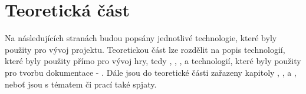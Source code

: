 \documentclass[main.tex]{subfiles}
\begin{document}
\section{Teoretická část} 
Na následujících stranách budou popsány jednotlivé technologie, které byly použity pro vývoj projektu. Teoretickou část lze rozdělit na popis technologií, které byly použity přímo pro vývoj hry, tedy , , , a technologií, které byly použity pro tvorbu dokumentace -  . Dále jsou do teoretické části zařazeny kapitoly , ,  a , neboť jsou s tématem či prací také spjaty.  
\end{document}
